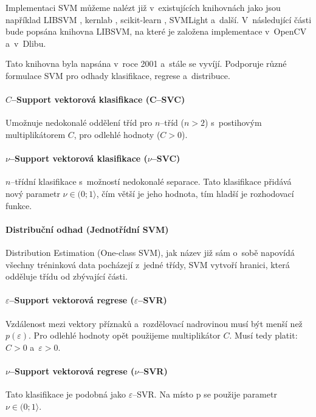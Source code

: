 Implementaci SVM můžeme nalézt již v~existujících knihovnách jako jsou například LIBSVM \cite{libsvm}, kernlab \cite{kernlab}, scikit-learn \cite{scikit-learn}, SVMLight \cite{svmlight} a~další. V~následující části bude popsána knihovna LIBSVM, na které je založena implementace v~OpenCV a~v~Dlibu.  

Tato knihovna byla napsána v~roce 2001 \cite{libsvm} a~stále se vyvíjí. Podporuje různé formulace SVM pro odhady klasifikace, regrese a~distribuce.

\paragraph*{$C$--Support vektorová klasifikace (C--SVC)} 
Umožnuje nedokonalé oddělení tříd pro $n$--tříd ($n > 2$) s~postihovým multiplikátorem $C$, pro odlehlé hodnoty ($C > 0$). \cite{csvmclass}

\paragraph*{$\nu$--Support vektorová klasifikace ($\nu$--SVC)} 
$n$--třídní klasifikace s~možností nedokonalé separace. Tato klasifikace přidává nový parametr $\nu \in (0;1\rangle$, čím větší je jeho hodnota, tím hladší je rozhodovací funkce. \cite{nusvmsvrclass}

\paragraph*{Distribuční odhad (Jednotřídní SVM)} 
Distribution Estimation (One-class SVM), jak název již sám o~sobě napovídá všechny tréninková data pocházejí z~jedné třídy, SVM vytvoří hranici, která odděluje třídu od zbývající části. \cite{oneclasssvm}

\paragraph*{$\varepsilon$--Support vektorová regrese ($\varepsilon$--SVR)} 
Vzdálenost mezi vektory příznaků a~rozdělovací nadrovinou musí být menší než $p (\varepsilon)$. Pro odlehlé hodnoty opět použijeme multiplikátor $C$. Musí tedy platit: $C > 0$ a~$\varepsilon > 0$. \cite{svrsvm}

\paragraph*{$\nu$--Support vektorová regrese ($\nu$--SVR)} 
Tato klasifikace je podobná jako $\varepsilon$--SVR. Na místo p se použije parametr $\nu \in (0;1\rangle$. \cite{nusvmsvrclass}

